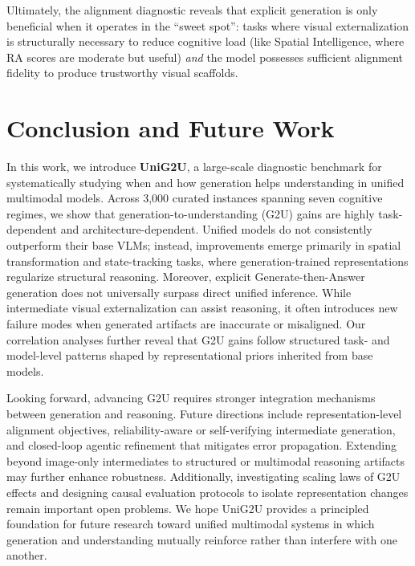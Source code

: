 \documentclass{article}
\theoremstyle{plain}
\theoremstyle{definition}
\theoremstyle{remark}
\begin{document}
Ultimately, the alignment diagnostic reveals that explicit generation is only beneficial when it operates in the ``sweet spot'': tasks where visual externalization is structurally necessary to reduce cognitive load (like Spatial Intelligence, where RA scores are moderate but useful) \emph{and} the model possesses sufficient alignment fidelity to produce trustworthy visual scaffolds.


\section{Conclusion and Future Work}

In this work, we introduce \textbf{UniG2U}, a large-scale diagnostic benchmark for systematically studying when and how generation helps understanding in unified multimodal models. Across 3,000 curated instances spanning seven cognitive regimes, we show that generation-to-understanding (G2U) gains are highly task-dependent and architecture-dependent. Unified models do not consistently outperform their base VLMs; instead, improvements emerge primarily in spatial transformation and state-tracking tasks, where generation-trained representations regularize structural reasoning. Moreover, explicit Generate-then-Answer generation does not universally surpass direct unified inference. While intermediate visual externalization can assist reasoning, it often introduces new failure modes when generated artifacts are inaccurate or misaligned. Our correlation analyses further reveal that G2U gains follow structured task- and model-level patterns shaped by representational priors inherited from base models.

Looking forward, advancing G2U requires stronger integration mechanisms between generation and reasoning. Future directions include representation-level alignment objectives, reliability-aware or self-verifying intermediate generation, and closed-loop agentic refinement that mitigates error propagation. Extending beyond image-only intermediates to structured or multimodal reasoning artifacts may further enhance robustness. Additionally, investigating scaling laws of G2U effects and designing causal evaluation protocols to isolate representation changes remain important open problems. We hope UniG2U provides a principled foundation for future research toward unified multimodal systems in which generation and understanding mutually reinforce rather than interfere with one another.


\end{document}
